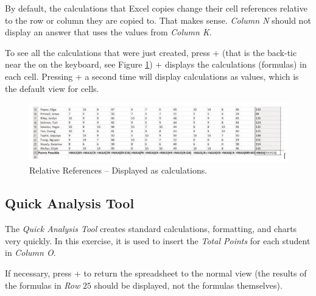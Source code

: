 By default, the calculations that Excel copies change their cell references relative to the row or column they are copied to. That makes sense. \textit{Column N} should not display an answer that uses the values from \textit{Column K}.

To see all the calculations that were just created, press  +  (that is the back-tic near the  on the keyboard, see Figure \ref{03:fig03})  +  displays the calculations (formulas) in each cell. Pressing  +  a second time will display calculations as values, which is the default view for cells.

\begin{figure}[H]
	\centering
	\includegraphics[width=\maxwidth{.95\linewidth}]{gfx/ch03_fig03}
	\caption{Relative References – Displayed as calculations.}
	\label{03:fig03}
\end{figure}

\subsection{Quick Analysis Tool}

The \textit{Quick Analysis Tool} creates standard calculations, formatting, and charts very quickly. In this exercise, it is used to insert the \textit{Total Points} for each student in \textit{Column O}.

If necessary, press  +  to return the spreadsheet to the normal view (the results of the formulas in \textit{Row }$ 25 $ should be displayed, not the formulas themselves).

